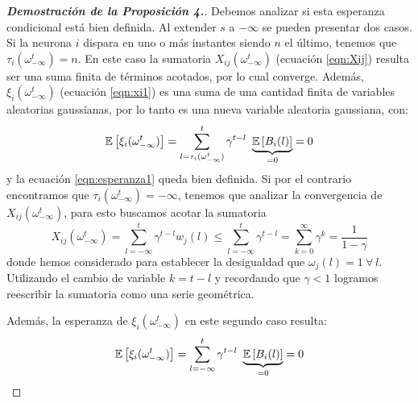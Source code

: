 \begin{proof}[\bf{Demostración de la Proposición 4.}]
Debemos analizar si esta esperanza condicional está bien definida. Al extender $s$ a $-\infty$ se pueden presentar dos casos. Si la neurona $i$ dispara en uno o más instantes siendo $n$ el último, tenemos que $\tau_i(\omega_{-\infty}^t) = n$. En este caso la sumatoria $X_{ij}(\omega_{-\infty}^t)$ (ecuación \eqref{eqn:Xij}) resulta ser una suma finita de términos acotados, por lo cual converge. Además, $\xi_i(\omega_{-\infty}^t)$ (ecuación \eqref{eqn:xi1}) es una suma de una cantidad finita de variables aleatorias gaussianas, por lo tanto es una nueva variable aleatoria gaussiana, con:
\begin{equation*}
    \mathbb{E} \left[\xi_i(\omega_{-\infty}^t)\right] = \sum_{l=\tau_i(\omega_{-\infty}^t)}^t \gamma^{t-l} \  \underbrace{\mathbb{E} \left[B_i(l)\right]}_{=0}=0
\end{equation*}
y la ecuación \eqref{eqn:esperanza1} queda bien definida. %
Si por el contrario encontramos que $\tau_i(\omega_{-\infty}^t) = -\infty$, tenemos que analizar la convergencia de $X_{ij}(\omega_{-\infty}^t)$, para esto buscamos acotar la sumatoria
\begin{equation*}
X_{ij}(\omega_{-\infty}^t) = \sum_{l=-\infty}^t \gamma^{t-l} w_j(l) \leq \sum_{l=-\infty}^t \gamma^{t-l} = 
\sum_{k=0}^\infty \gamma^k = \frac{1}{1-\gamma}
\end{equation*}
donde hemos considerado para establecer la desigualdad que $\omega_j(l)=1 \ \forall \ l$. Utilizando el cambio de variable $k=t-l$ y recordando que $\gamma<1$ logramos reescribir la sumatoria como una serie geométrica.
 
Además, la esperanza de $\xi_i(\omega_{-\infty}^t)$ en este segundo caso resulta: 
\begin{equation*}
    \mathbb{E} \left[\xi_i(\omega_{-\infty}^t)\right] = \sum_{l=-\infty}^t \gamma^{t-l} \  \underbrace{\mathbb{E} \left[B_i(l)\right]}_{=0}=0
\end{equation*}


\end{proof}
